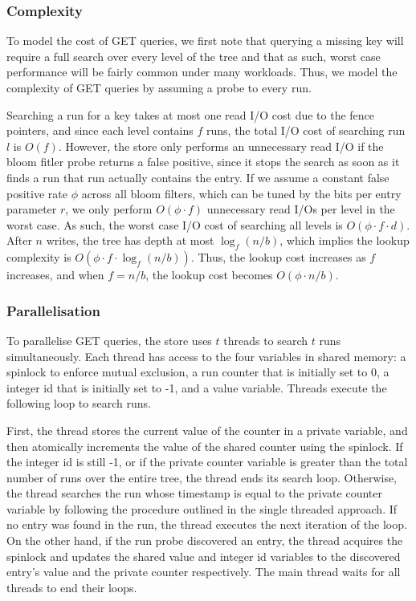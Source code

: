 \documentclass{acm}
\begin{document}
\subsubsection{Complexity}

To model the cost of GET queries, we first note that querying a missing key will require a full search over every level of the tree and that as such, worst case performance will be fairly common under many workloads. Thus, we model the complexity of GET queries by assuming a probe to every run.

Searching a run for a key takes at most one read I/O cost due to the fence pointers, and since each level contains $f$ runs, the total I/O cost of searching run $l$ is $O(f)$. However, the store only performs an unnecessary read I/O if the bloom fitler probe returns a false positive, since it stops the search as soon as it finds a run that run actually contains the entry. If we assume a constant false positive rate $\phi$ across all bloom filters, which can be tuned by the bits per entry parameter $r$, we only perform $O(\phi \cdot f)$ unnecessary read I/Os per level in the worst case. As such, the worst case I/O cost of searching all levels is $O\left(\phi \cdot f \cdot d\right)$. After $n$ writes, the tree has depth at most $\log_f(n/b)$, which implies the lookup complexity is $O(\phi \cdot f \cdot \log_f(n/b))$. Thus, the lookup cost increases as $f$ increases, and when $f=n/b$, the lookup cost becomes $O(\phi \cdot n/b)$.

\subsubsection{Parallelisation}

To parallelise GET queries, the store uses $t$ threads to search $t$ runs simultaneously. Each thread has access to the four variables in shared memory: a spinlock to enforce mutual exclusion, a run counter that is initially set to 0, a integer id that is initially set to -1, and a value variable. Threads execute the following loop to search runs.

First, the thread stores the current value of the counter in a private variable, and then atomically increments the value of the shared counter using the spinlock. If the integer id is still -1, or if the private counter variable is greater than the total number of runs over the entire tree, the thread ends its search loop. Otherwise, the thread searches the run whose timestamp is equal to the private counter variable by following the procedure outlined in the single threaded approach. If no entry was found in the run, the thread executes the next iteration of the loop. On the other hand, if the run probe discovered an entry, the thread acquires the spinlock and updates the shared value and integer id variables to the discovered entry's value and the private counter respectively. The main thread waits for all threads to end their loops.
\end{document}
